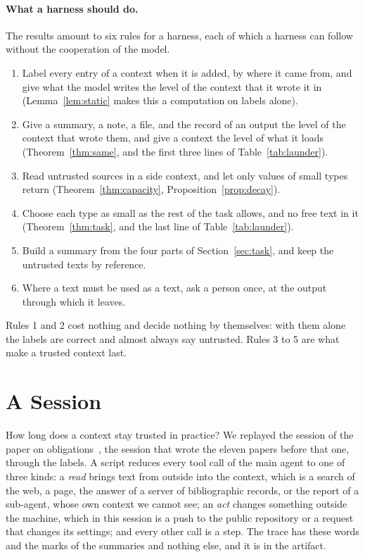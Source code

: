 \documentclass[acmsmall,nonacm,screen]{acmart}
\begin{document}
\paragraph{What a harness should do.} The results amount to six rules for a harness, each of
which a harness can follow without the cooperation of the model.
\begin{enumerate}
\item Label every entry of a context when it is added, by where it came from, and give what
  the model writes the level of the context that it wrote it in
  (Lemma~\ref{lem:static} makes this a computation on labels alone).
\item Give a summary, a note, a file, and the record of an output the level of the context
  that wrote them, and give a context the level of what it loads
  (Theorem~\ref{thm:same}, and the first three lines of Table~\ref{tab:launder}).
\item Read untrusted sources in a side context, and let only values of small types return
  (Theorem~\ref{thm:capacity}, Proposition~\ref{prop:decay}).
\item Choose each type as small as the rest of the task allows, and no free text in it
  (Theorem~\ref{thm:task}, and the last line of Table~\ref{tab:launder}).
\item Build a summary from the four parts of Section~\ref{sec:task}, and keep the untrusted
  texts by reference.
\item Where a text must be used as a text, ask a person once, at the output through which it
  leaves.
\end{enumerate}
Rules 1 and 2 cost nothing and decide nothing by themselves: with them alone the labels are
correct and almost always say untrusted. Rules 3 to 5 are what make a trusted context last.

\section{A Session}
\label{sec:session}

How long does a context stay trusted in practice? We replayed the session of the paper on
obligations~\cite{tpp12}, the session that wrote the eleven papers before that one, through
the labels. A script reduces every tool call of the main agent to one of three kinds: a
\emph{read} brings text from outside into the context, which is a search of the web, a page,
the answer of a server of bibliographic records, or the report of a sub-agent, whose own
context we cannot see; an \emph{act} changes something outside the machine, which in this
session is a push to the public repository or a request that changes its settings; and every
other call is a step. The trace has these words and the marks of the summaries and nothing
else, and it is in the artifact.
\end{document}
